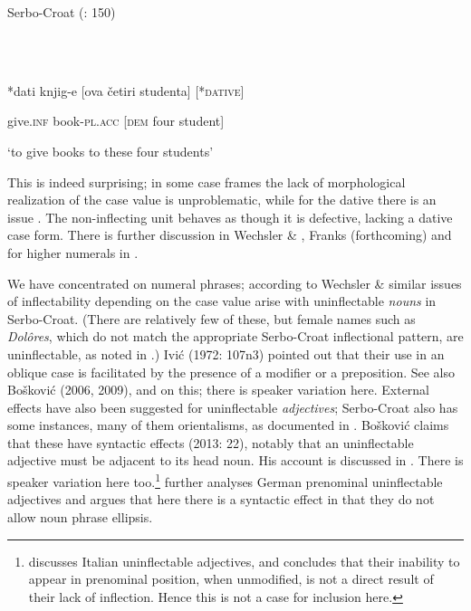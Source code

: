 \documentclass[output=paper]{langscibook}
\begin{document}
Serbo-Croat (\citealt{WechslerZlatić2003}: 150)

\ea%
    \label{ex:key:25}
    \gll \\
         \\
    \glt
    \z %

          *dati  knjig-e  [ova četiri studenta]    [*\textsc{dative}]

  give.\textsc{inf}  book-\textsc{pl.acc}  [\textsc{dem} four student]

  ‘to give books to these four students’

This is indeed surprising; in some case frames the lack of morphological realization of the case value is unproblematic, while for the dative there is an issue . The non-inflecting unit behaves as though it is defective, lacking a dative case form. There is further discussion in Wechsler \& \citet[148-152]{Zlatić2003}, Franks (forthcoming) and for higher numerals in \citet{Bošković2006}.

We have concentrated on numeral phrases; according to Wechsler \& \citet[133-140]{Zlatić2003} similar issues of inflectability depending on the case value arise with uninflectable \textit{nouns} in Serbo-Croat. (There are relatively few of these, but female names such as \textit{Dolôres}, which do not match the appropriate Serbo-Croat inflectional pattern, are uninflectable, as noted in .) Ivić (1972: 107n3) pointed out that their use in an oblique case is facilitated by the presence of a modifier or a preposition. See also Bošković (2006, 2009), \citet{Horvath2014} and \citet[103-111]{Adamson2019} on this; there is speaker variation here. External effects have also been suggested for uninflectable \textit{adjectives}; Serbo-Croat also has some instances, many of them orientalisms, as documented in \citet{Nikolić1996}. Bošković claims that these have syntactic effects (2013: 22), notably that an uninflectable adjective must be adjacent to its head noun. His account is discussed in \citet[115-121]{Adamson2019}. There is speaker variation here too.\footnote{ \textrm{\citet[121-131]{Adamson2019} discusses Italian uninflectable adjectives, and concludes that their inability to appear in prenominal position, when unmodified, is not a direct result of their lack of inflection. Hence this is not a case for inclusion here.} } \citet[160-184]{Adamson2019} further analyses German prenominal uninflectable adjectives and argues that here there is a syntactic effect in that they do not allow noun phrase ellipsis.
\end{document}
